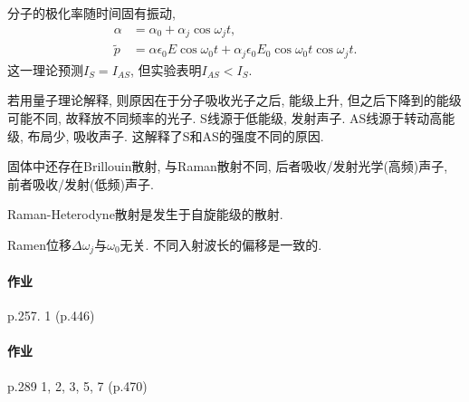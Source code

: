 \documentclass{ctexart}
\begin{document}
分子的极化率随时间固有振动, 
\begin{align*}
    \alpha &= \alpha_0 + \alpha_j \cos\omega_j t, \\
    \tilde{p} &= \alpha\epsilon_0 E \cos\omega_0 t + \alpha_j \epsilon_0 E_0 \cos\omega_0 t \cos\omega_j t.
\end{align*}
这一理论预测$I_S = I_{AS}$, 但实验表明$I_{AS} < I_S$.

\par
若用量子理论解释, 则原因在于分子吸收光子之后, 能级上升, 但之后下降到的能级可能不同, 故释放不同频率的光子. S线源于低能级, 发射声子. AS线源于转动高能级, 布局少, 吸收声子. 这解释了S和AS的强度不同的原因.


\par
固体中还存在Brillouin散射, 与Raman散射不同, 后者吸收/发射光学(高频)声子, 前者吸收/发射(低频)声子.

\par
Raman-Heterodyne散射是发生于自旋能级的散射.

\begin{remark}
    Ramen位移$\Delta \omega_j$与$\omega_0$无关. 不同入射波长的偏移是一致的.
\end{remark}


\paragraph{作业} %
\label{par:作业}

p.257. 1 (p.446)


\paragraph{作业} %
\label{par:作业}

p.289 1, 2, 3, 5, 7 (p.470)



\end{document}
